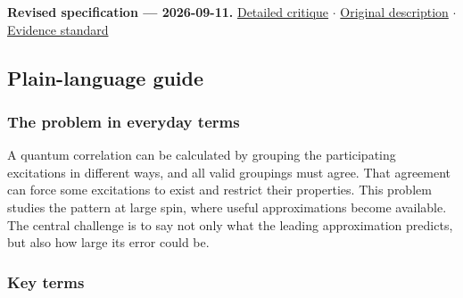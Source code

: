 \documentclass[
  11pt,
]{article}
\begin{document}
\textbf{Revised specification --- 2026-09-11.}
\href{https://github.com/rick-stevens-ai/Pure-Thought/blob/main/reviews/04-Modular-Lightcone-Bootstrap.md}{Detailed
critique} \ensuremath{\cdot}
\href{https://github.com/rick-stevens-ai/Pure-Thought/blob/main/archive/original-PRDs/04-Modular-Lightcone-Bootstrap.md}{Original
description} \ensuremath{\cdot}
\href{https://github.com/rick-stevens-ai/Pure-Thought/blob/main/reviews/EVIDENCE-STANDARD.md}{Evidence
standard}

\subsection{Plain-language guide}

\subsubsection{The problem in everyday terms}

A quantum correlation can be calculated by grouping the participating
excitations in different ways, and all valid groupings must agree. That
agreement can force some excitations to exist and restrict their
properties. This problem studies the pattern at large spin, where useful
approximations become available. The central challenge is to say not
only what the leading approximation predicts, but also how large its
error could be.

\subsubsection{Key terms}
\end{document}
